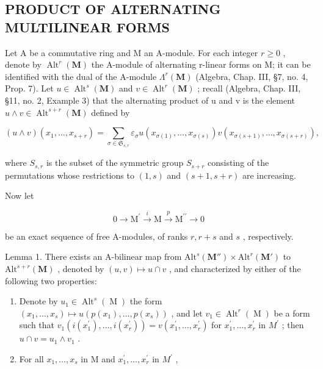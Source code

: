 \subsection{PRODUCT OF ALTERNATING MULTILINEAR FORMS}

Let A be a commutative ring and M an A-module. For each integer \(r \geq 0\) , denote by \(\operatorname{Alt}^{r}(\mathbf{M})\) the A-module of alternating r-linear forms on M; it can be identified with the dual of the A-module \(\Lambda^{r}(\mathbf{M})\) (Algebra, Chap. III, §7, no. 4, Prop. 7). Let \(u \in \operatorname{Alt}^{s}(\mathbf{M})\) and \(v \in \operatorname{Alt}^{r}(\mathbf{M})\) ; recall (Algebra, Chap. III, §11, no. 2, Example 3) that the alternating product of u and v is the element \(u \wedge v \in \operatorname{Alt}^{s+r}(\mathbf{M})\) defined by

\[
(u \wedge v) (x _ {1}, \dots , x _ {s + r}) = \sum_ {\sigma \in \mathfrak {S} _ {s, r}} \varepsilon_ {\sigma} u (x _ {\sigma (1)}, \dots , x _ {\sigma (s)}) v (x _ {\sigma (s + 1)}, \dots , x _ {\sigma (s + r)}),
\]

where \(S_{s,r}\) is the subset of the symmetric group \(S_{s+r}\) consisting of the permutations whose restrictions to \((1,s)\) and \((s+1,s+r)\) are increasing.

Now let

\[
0 \longrightarrow \mathrm{M} ^ {\prime} \stackrel {i} {\longrightarrow} \mathrm{M} \stackrel {p} {\longrightarrow} \mathrm{M} ^ {\prime \prime} \longrightarrow 0
\]

be an exact sequence of free A-modules, of ranks \(r, r + s\) and \(s\) , respectively.

Lemma 1. There exists an A-bilinear map from \(\mathrm{Alt}^s (\mathbf{M}'')\times \mathrm{Alt}^r (\mathbf{M}')\) to \(\mathrm{Alt}^{s + r}(\mathbf{M})\) , denoted by \((u,v)\mapsto u\cap v\) , and characterized by either of the following two properties:

\begin{enumerate}
\def\labelenumi{\alph{enumi})}
\item
  Denote by \(u_{1} \in \operatorname{Alt}^{s}(\operatorname{M})\) the form \((x_{1}, \ldots, x_{s}) \mapsto u(p(x_{1}), \ldots, p(x_{s}))\) , and let \(v_{1} \in \operatorname{Alt}^{r}(\operatorname{M})\) be a form such that \(v_{1}(i(x_{1}^{\prime}), \ldots, i(x_{r}^{\prime})) = v(x_{1}^{\prime}, \ldots, x_{r}^{\prime})\) for \(x_{1}^{\prime}, \ldots, x_{r}^{\prime}\) in \(M^{\prime}\) ; then \(u \cap v = u_{1} \wedge v_{1}\) .
\item
  For all \(x_{1},\ldots,x_{s}\) in M and \(x_{1}^{\prime},\ldots,x_{r}^{\prime}\) in \(M^{\prime}\) ,
\end{enumerate}

